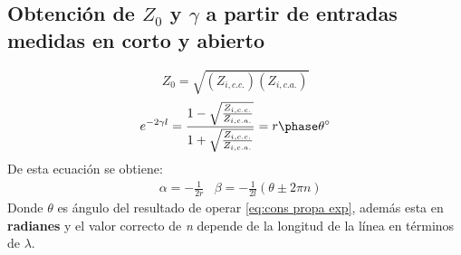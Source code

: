\documentclass[
	12pt, %
	fleqn, %
	a4paper, %
	oneside, %
]{LegrandOrangeBook}
\begin{document}
\subsection{Obtención de $Z_0$ y $\gamma$ a partir de entradas medidas en corto y abierto}
\begin{equation}
Z_0=\sqrt{\left(Z_{i,c.c.}\right)\left(Z_{i,c.a.}\right)}
\label{eq:impedancia con corto y abierto}
\end{equation}
\begin{equation}
e^{-2\gamma l}=\frac{1-\sqrt{\frac{Z_{i,c.c.}}{Z_{i,c.a.}}}}{1+\sqrt{\frac{Z_{i,c.c.}}{Z_{i,c.a.}}}}=\fase{r}{\theta}
\label{eq:cons propa exp}
\end{equation}
De esta ecuación se obtiene:
\begin{align}
&\alpha=-\frac{1}{2r} &\beta=-\frac{1}{2l}(\theta\pm 2\pi n)
\label{eq: alfa beta const}
\end{align}
Donde $\theta$ es ángulo del resultado de operar \ref{eq:cons propa exp}, además esta en \textbf{radianes} y el valor correcto de \textit{n} depende de la longitud de la línea en términos de $\lambda$.
\end{document}
